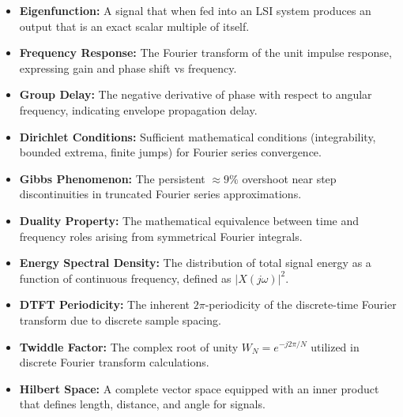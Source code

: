 \documentclass[12pt,a4paper]{article}
\begin{document}
\begin{tcolorbox}[defbox, title={\textbf{One-Line Definitions}}]
\begin{itemize}[leftmargin=*, itemsep=2pt, topsep=0pt]
  \item \textbf{Eigenfunction:} A signal that when fed into an LSI system produces an output that is an exact scalar multiple of itself.
  \item \textbf{Frequency Response:} The Fourier transform of the unit impulse response, expressing gain and phase shift vs frequency.
  \item \textbf{Group Delay:} The negative derivative of phase with respect to angular frequency, indicating envelope propagation delay.
  \item \textbf{Dirichlet Conditions:} Sufficient mathematical conditions (integrability, bounded extrema, finite jumps) for Fourier series convergence.
  \item \textbf{Gibbs Phenomenon:} The persistent $\approx 9\%$ overshoot near step discontinuities in truncated Fourier series approximations.
  \item \textbf{Duality Property:} The mathematical equivalence between time and frequency roles arising from symmetrical Fourier integrals.
  \item \textbf{Energy Spectral Density:} The distribution of total signal energy as a function of continuous frequency, defined as $|X(j\omega)|^2$.
  \item \textbf{DTFT Periodicity:} The inherent $2\pi$-periodicity of the discrete-time Fourier transform due to discrete sample spacing.
  \item \textbf{Twiddle Factor:} The complex root of unity $W_N = e^{-j 2\pi / N}$ utilized in discrete Fourier transform calculations.
  \item \textbf{Hilbert Space:} A complete vector space equipped with an inner product that defines length, distance, and angle for signals.
\end{itemize}
\end{tcolorbox}
\end{document}
